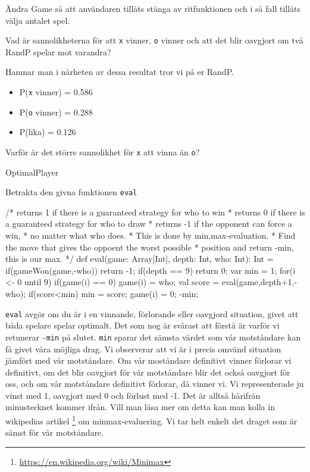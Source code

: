 \Subtask Ändra Game så att användaren tillåts stänga av ritfunktionen och i så fall tillåts välja antalet spel.

\Subtask Vad är sannolikheterna för att \texttt{x} vinner, \texttt{o} vinner och att det blir oavgjort om två RandP spelar mot varandra?

Hamnar man i närheten av dessa resultat tror vi på er RandP.
\begin{itemize}
	\item P(\texttt{x} vinner) = 0.586
	\item P(\texttt{o} vinner) = 0.288
	\item P(lika) = 0.126
\end{itemize}

\Subtask Varför är det större sannolikhet för \texttt{x} att vinna än \texttt{o}?

\Task OptimalPlayer

Betrakta den givna funktionen \texttt{eval}
\begin{Code}
/* returns 1 if there is a guaranteed strategy for who to win 
 * returns 0 if there is a guaranteed strategy for who to draw 
 * returns -1 if the opponent can force a win,
 * no matter what who does.
 * This is done by min,max-evaluation. 
 * Find the move that gives the oppoent the worst possible
 * position and return -min, this is our max.
 */
def eval(game: Array[Int], depth: Int, who: Int): Int = {
	if(gameWon(game,-who)) return -1;
	if(depth == 9) return 0;
	var min = 1;
	for(i <- 0 until 9) {
		if(game(i) == 0) {
			game(i) = who;
			val score = eval(game,depth+1,-who);
			if(score<min){
				min = score;
			}
			game(i) = 0;
		}
	}
	-min;
}
\end{Code}

\texttt{eval} avgör om du är i en vinnande, förlorande eller oavgjord situation, givet att båda spelare spelar optimalt. Det som nog är svårast att förstå är varför vi retunerar \texttt{-min} på slutet. \texttt{min} sparar det sämsta värdet som vår motståndare kan få givet våra möjliga drag. Vi observerar att vi är i precis omvänd situation jämfört med vår motståndare. Om vår moståndare definitivt vinner förlorar vi definitivt, om det blir oavgjort för vår motståndare blir det också oavgjort för oss, och om vår motståndare definitivt förlorar, då vinner vi. Vi representerade ju vinst med 1, oavgjort med 0 och förlust med -1. Det är alltså härifrån minustecknet kommer ifrån. Vill man läsa mer om detta kan man kolla in wikipedias artikel \footnote{\url{https://en.wikipedia.org/wiki/Minimax}} om minmax-evaluering. Vi tar helt enkelt det draget som är sämst för vår motståndare.

